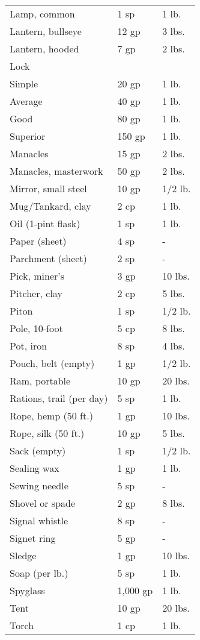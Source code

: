 \begin{table}[]
\begin{tabular}{lll}
 Lamp, common & 1 sp & 1 lb. \\
 Lantern, bullseye & 12 gp & 3 lbs. \\
 Lantern, hooded & 7 gp & 2 lbs. \\
 Lock  \\
 Simple & 20 gp & 1 lb. \\
 Average & 40 gp & 1 lb. \\
 Good & 80 gp & 1 lb. \\
 Superior & 150 gp & 1 lb. \\
 Manacles & 15 gp & 2 lbs. \\
 Manacles, masterwork & 50 gp & 2 lbs. \\
 Mirror, small steel & 10 gp & 1/2 lb. \\
 Mug/Tankard, clay & 2 cp & 1 lb. \\
 Oil (1-pint flask) & 1 sp & 1 lb. \\
 Paper (sheet) & 4 sp & - \\
 Parchment (sheet) & 2 sp & - \\
 Pick, miner's & 3 gp & 10 lbs. \\
 Pitcher, clay & 2 cp & 5 lbs. \\
 Piton & 1 sp & 1/2 lb. \\
 Pole, 10-foot & 5 cp & 8 lbs. \\
 Pot, iron & 8 sp & 4 lbs. \\
 Pouch, belt (empty) & 1 gp & 1/2 lb. \\
 Ram, portable & 10 gp & 20 lbs. \\
 Rations, trail (per day) & 5 sp & 1 lb. \\
 Rope, hemp (50 ft.) & 1 gp & 10 lbs. \\
 Rope, silk (50 ft.) & 10 gp & 5 lbs. \\
 Sack (empty) & 1 sp & 1/2 lb. \\
 Sealing wax & 1 gp & 1 lb. \\
 Sewing needle & 5 sp & - \\
 Shovel or spade & 2 gp & 8 lbs. \\
 Signal whistle & 8 sp & - \\
 Signet ring & 5 gp & - \\
 Sledge & 1 gp & 10 lbs. \\
 Soap (per lb.) & 5 sp & 1 lb. \\
 Spyglass & 1,000 gp & 1 lb. \\
 Tent & 10 gp & 20 lbs. \\
 Torch & 1 cp & 1 lb. \\

\end{tabular}
\end{table}
